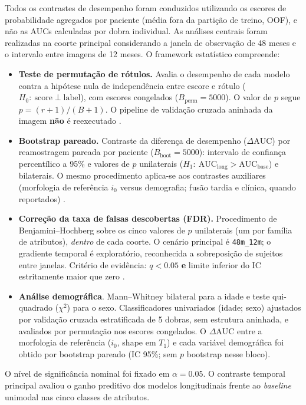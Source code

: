 \documentclass[review]{elsarticle}
\newcommand{\code}[1]{\texttt{#1}}
\begin{document}
	Todos os contrastes de desempenho foram conduzidos utilizando os escores de probabilidade agregados por paciente (média fora da partição de treino, OOF), e não as AUCs calculadas por dobra individual. As análises centrais foram realizadas na coorte principal considerando a janela de observação de 48 meses e o intervalo entre imagens de 12 meses. O framework estatístico compreende:
	\begin{itemize}
		\item \textbf{Teste de permutação de rótulos.} Avalia o desempenho de cada modelo contra a hipótese nula de independência entre escore e rótulo ($H_0{:}\ \mathrm{score}\perp\mathrm{label}$), com escores congelados ($B_{\mathrm{perm}}=5000$). O valor de $p$ segue $p=(r+1)/(B+1)$. O pipeline de validação cruzada aninhada da imagem \textbf{não} é reexecutado \cite{good-2005}.
		
		\item \textbf{Bootstrap pareado.} Contraste da diferença de desempenho ($\Delta\mathrm{AUC}$) por reamostragem pareada por paciente ($B_{\mathrm{boot}}=5000$): intervalo de confiança percentílico a 95\% e valores de $p$ unilaterais ($H_1{:}\ \mathrm{AUC}_{\mathrm{long}}>\mathrm{AUC}_{\mathrm{base}}$) e bilaterais. O mesmo procedimento aplica-se aos contrastes auxiliares (morfologia de referência $i_0$ versus demografia; fusão tardia e clínica, quando reportados) \cite{efron-1994}.
		
		\item \textbf{Correção da taxa de falsas descobertas (FDR).} Procedimento de Benjamini--Hochberg sobre os cinco valores de $p$ unilaterais (um por família de atributos), \emph{dentro} de cada coorte. O cenário principal é \code{48m\_12m}; o gradiente temporal é exploratório, reconhecida a sobreposição de sujeitos entre janelas. Critério de evidência: $q<0.05$ \textbf{e} limite inferior do IC estritamente maior que zero \cite{benjamini-1995}.
		
		\item \textbf{Análise demográfica}. Mann--Whitney bilateral para a idade e teste qui-quadrado ($\chi^2$) para o sexo. Classificadores univariados (idade; sexo) ajustados por validação cruzada estratificada de 5 dobras, sem estrutura aninhada, e avaliados por permutação nos escores congelados. O $\Delta\mathrm{AUC}$ entre a morfologia de referência ($i_0$, shape em $T_1$) e cada variável demográfica foi obtido por bootstrap pareado (IC 95\%; sem $p$ bootstrap nesse bloco).
	\end{itemize}
	O nível de significância nominal foi fixado em $\alpha=0.05$. O contraste temporal principal avaliou o ganho preditivo dos modelos longitudinais frente ao \emph{baseline} unimodal nas cinco classes de atributos.
	
\end{document}
